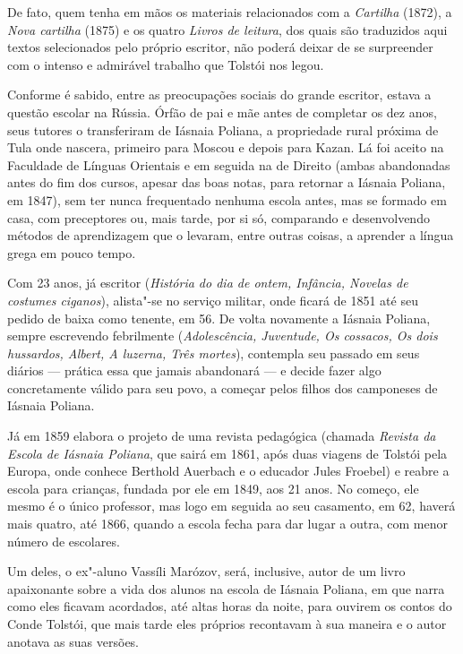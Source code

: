 De fato, quem tenha em mãos os materiais relacionados com
a \emph{Cartilha} (1872), a \emph{Nova cartilha} (1875) e os
quatro \emph{Livros de leitura}, dos quais são traduzidos aqui textos
selecionados pelo próprio escritor, não poderá deixar de se
surpreender com o intenso e admirável trabalho que Tolstói nos legou.

Conforme é sabido, entre as preocupações sociais do grande escritor,
estava a questão escolar na Rússia. Órfão de pai e mãe antes de
completar os dez anos, seus tutores o transferiram de Iásnaia Poliana, a
propriedade rural próxima de Tula onde nascera, primeiro para Moscou e
depois para Kazan. Lá foi aceito na Faculdade de Línguas Orientais e em
seguida na de Direito (ambas abandonadas antes do fim dos
cursos, apesar das boas notas, para retornar a Iásnaia Poliana, em
1847), sem ter nunca frequentado nenhuma escola antes, mas se formado em
casa, com preceptores ou, mais tarde, por si só, comparando e
desenvolvendo métodos de aprendizagem que o levaram, entre outras
coisas, a aprender a língua grega em pouco tempo. 

Com 23 anos, já escritor (\emph{História do dia de ontem, Infância,
Novelas de costumes ciganos}), alista"-se no serviço militar, onde ficará
de 1851 até seu pedido de baixa como tenente, em 56. De volta novamente
a Iásnaia Poliana, sempre escrevendo febrilmente (\emph{Adolescência,
Juventude, Os cossacos, Os dois hussardos, Albert, A luzerna, Três
mortes}), contempla seu passado em seus diários --- prática essa que
jamais abandonará --- e decide fazer algo concretamente válido para seu
povo, a começar pelos filhos dos camponeses de Iásnaia Poliana.

Já em 1859 elabora o projeto de uma revista pedagógica
(chamada \emph{Revista da Escola de Iásnaia Poliana}, que sairá
em 1861, após duas viagens de Tolstói pela Europa, onde conhece Berthold
Auerbach e o educador Jules Froebel) e reabre a escola para crianças,
fundada por ele em 1849, aos 21 anos. No começo, ele mesmo é o
único professor, mas logo em seguida ao seu casamento, em 62, haverá
mais quatro, até 1866, quando a escola fecha para dar lugar a outra, com
menor número de escolares.

Um deles, o ex"-aluno Vassíli Marózov, será, inclusive, autor de um livro
apaixonante sobre a vida dos alunos na escola de Iásnaia
Poliana, em que narra como eles ficavam acordados, até altas horas da
noite, para ouvirem os contos do Conde Tolstói, que mais tarde eles
próprios recontavam à sua maneira e o autor anotava as suas
versões.

